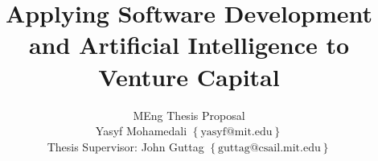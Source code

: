 \documentclass[12pt, draftclsnofoot, journal, onecolumn]{IEEEtran}
\begin{document}

\title{Applying Software Development and Artificial Intelligence to Venture Capital}

\author{MEng Thesis Proposal \\
Yasyf Mohamedali $\left\{\textrm{yasyf@mit.edu}\right\}$\\
  Thesis Supervisor: John Guttag $\left\{\textrm{guttag@csail.mit.edu}\right\}$
}

\maketitle













%
% 
\end{document}
